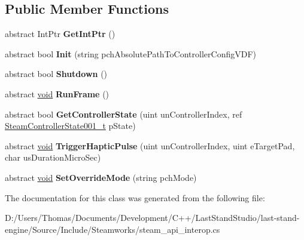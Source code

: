 \subsection*{Public Member Functions}
\begin{DoxyCompactItemize}
\item 
\hypertarget{classValve_1_1Steamworks_1_1ISteamController_ae044b24127646d292bd403cb6a14fa4b}{}abstract Int\+Ptr {\bfseries Get\+Int\+Ptr} ()\label{classValve_1_1Steamworks_1_1ISteamController_ae044b24127646d292bd403cb6a14fa4b}

\item 
\hypertarget{classValve_1_1Steamworks_1_1ISteamController_a8daae8e83b1a7acae88f5ddcc9f996f4}{}abstract bool {\bfseries Init} (string pch\+Absolute\+Path\+To\+Controller\+Config\+V\+D\+F)\label{classValve_1_1Steamworks_1_1ISteamController_a8daae8e83b1a7acae88f5ddcc9f996f4}

\item 
\hypertarget{classValve_1_1Steamworks_1_1ISteamController_a144f9f2c93d9b5d3113c7fb5c3e857dd}{}abstract bool {\bfseries Shutdown} ()\label{classValve_1_1Steamworks_1_1ISteamController_a144f9f2c93d9b5d3113c7fb5c3e857dd}

\item 
\hypertarget{classValve_1_1Steamworks_1_1ISteamController_a480c84be1fd08cb012b587a537c04345}{}abstract \hyperlink{SDL__audio_8h_a52835ae37c4bb905b903cbaf5d04b05f}{void} {\bfseries Run\+Frame} ()\label{classValve_1_1Steamworks_1_1ISteamController_a480c84be1fd08cb012b587a537c04345}

\item 
\hypertarget{classValve_1_1Steamworks_1_1ISteamController_ad7052fe69e649e33921bb8fd6df710fd}{}abstract bool {\bfseries Get\+Controller\+State} (uint un\+Controller\+Index, ref \hyperlink{structValve_1_1Steamworks_1_1SteamControllerState001__t}{Steam\+Controller\+State001\+\_\+t} p\+State)\label{classValve_1_1Steamworks_1_1ISteamController_ad7052fe69e649e33921bb8fd6df710fd}

\item 
\hypertarget{classValve_1_1Steamworks_1_1ISteamController_a26de2eba83f8c98c2f9075d4852f0c81}{}abstract \hyperlink{SDL__audio_8h_a52835ae37c4bb905b903cbaf5d04b05f}{void} {\bfseries Trigger\+Haptic\+Pulse} (uint un\+Controller\+Index, uint e\+Target\+Pad, char us\+Duration\+Micro\+Sec)\label{classValve_1_1Steamworks_1_1ISteamController_a26de2eba83f8c98c2f9075d4852f0c81}

\item 
\hypertarget{classValve_1_1Steamworks_1_1ISteamController_aafb87c4adb72038546da80ba529a01e6}{}abstract \hyperlink{SDL__audio_8h_a52835ae37c4bb905b903cbaf5d04b05f}{void} {\bfseries Set\+Override\+Mode} (string pch\+Mode)\label{classValve_1_1Steamworks_1_1ISteamController_aafb87c4adb72038546da80ba529a01e6}

\end{DoxyCompactItemize}


The documentation for this class was generated from the following file\+:\begin{DoxyCompactItemize}
\item 
D\+:/\+Users/\+Thomas/\+Documents/\+Development/\+C++/\+Last\+Stand\+Studio/last-\/stand-\/engine/\+Source/\+Include/\+Steamworks/steam\+\_\+api\+\_\+interop.\+cs\end{DoxyCompactItemize}
